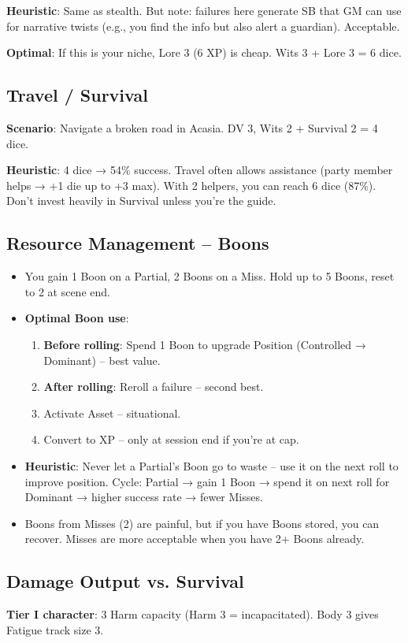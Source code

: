 \documentclass[11pt]{article}
\begin{document}
\textbf{Heuristic}: Same as stealth. But note: failures here generate SB that GM can use for narrative twists (e.g., you find the info but also alert a guardian). Acceptable.

\textbf{Optimal}: If this is your niche, Lore 3 (6 XP) is cheap. Wits 3 + Lore 3 = 6 dice.

\subsection{Travel / Survival}
\textbf{Scenario}: Navigate a broken road in Acasia. DV 3, Wits 2 + Survival 2 = 4 dice.

\textbf{Heuristic}: 4 dice → 54\% success. Travel often allows assistance (party member helps → +1 die up to +3 max). With 2 helpers, you can reach 6 dice (87\%). Don't invest heavily in Survival unless you're the guide.

\subsection{Resource Management – Boons}
\begin{itemize}
    \item You gain 1 Boon on a Partial, 2 Boons on a Miss. Hold up to 5 Boons, reset to 2 at scene end.
    \item \textbf{Optimal Boon use}: 
        \begin{enumerate}
            \item \textbf{Before rolling}: Spend 1 Boon to upgrade Position (Controlled → Dominant) – best value.
            \item \textbf{After rolling}: Reroll a failure – second best.
            \item Activate Asset – situational.
            \item Convert to XP – only at session end if you're at cap.
        \end{enumerate}
    \item \textbf{Heuristic}: Never let a Partial's Boon go to waste – use it on the next roll to improve position. Cycle: Partial → gain 1 Boon → spend it on next roll for Dominant → higher success rate → fewer Misses.
    \item Boons from Misses (2) are painful, but if you have Boons stored, you can recover. Misses are more acceptable when you have 2+ Boons already.
\end{itemize}

\subsection{Damage Output vs. Survival}
\textbf{Tier I character}: 3 Harm capacity (Harm 3 = incapacitated). Body 3 gives Fatigue track size 3.
\end{document}
